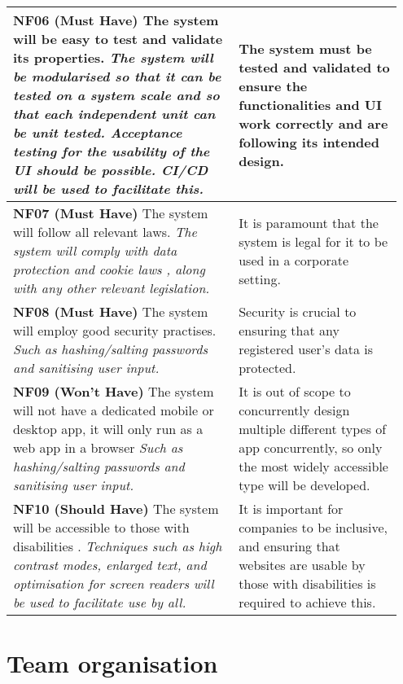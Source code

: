 \documentclass[10pt]{article}
\begin{document}
\begin{longtable}{|p{0.55\linewidth}|p{0.4\linewidth}|}
    \textbf{NF06 (Must Have) }
    The system will be easy to test and validate its properties.
    \textit{The system will be modularised so that it can be tested on a system
    scale and so that each independent unit can be unit tested. Acceptance
    testing for the usability of the UI should be possible. CI/CD will be used
    to facilitate this.}
        &
    The system must be tested and validated to ensure the functionalities and UI
    work correctly and are following its intended design.
    \\ \hline

    \textbf{NF07 (Must Have) }
    The system will follow all relevant laws.
    \textit{The system will comply with data protection \cite{data_protection} and cookie laws \cite{cookie_law}, along
    with any other relevant legislation.}
        &
    It is paramount that the system is legal for it to be used in a corporate
    setting.
    \\ \hline

    \textbf{NF08 (Must Have) }
    The system will employ good security practises.
    \textit{Such as hashing/salting passwords and sanitising user input.}
        &
    Security is crucial to ensuring that any registered user's data is protected.
    \\ \hline

    \textbf{NF09 (Won't Have) }
    The system will not have a dedicated mobile or desktop app, it will only
    run as a web app in a browser
    \textit{Such as hashing/salting passwords and sanitising user input.}
        &
    It is out of scope to concurrently design multiple different types of app
    concurrently, so only the most widely accessible type will be developed.
    \\ \hline

    \textbf{NF10 (Should Have) }
    The system will be accessible to those with disabilities \cite{accessibility}.
    \textit{Techniques such as high contrast modes, enlarged text, and
    optimisation for screen readers will be used to facilitate use by all.}
        &
    It is important for companies to be inclusive, and ensuring that websites
    are usable by those with disabilities is required to achieve this.
    \\ \hline

\end{longtable}

\vspace{-4mm}\section{Team organisation}\vspace{-2mm}
\end{document}
